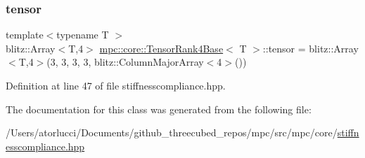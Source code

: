 \subsubsection{\texorpdfstring{tensor}{tensor}}
{\footnotesize\ttfamily template$<$typename T $>$ \\
blitz\+::\+Array$<$T,4$>$ \mbox{\hyperlink{structmpc_1_1core_1_1_tensor_rank4_base}{mpc\+::core\+::\+Tensor\+Rank4\+Base}}$<$ T $>$\+::tensor = blitz\+::\+Array$<$T,4$>$(3, 3, 3, 3, blitz\+::\+Column\+Major\+Array$<$4$>$())}



Definition at line 47 of file stiffnesscompliance.\+hpp.



The documentation for this class was generated from the following file\+:\begin{DoxyCompactItemize}
\item 
/\+Users/atorlucci/\+Documents/github\+\_\+threecubed\+\_\+repos/mpc/src/mpc/core/\mbox{\hyperlink{stiffnesscompliance_8hpp}{stiffnesscompliance.\+hpp}}\end{DoxyCompactItemize}
